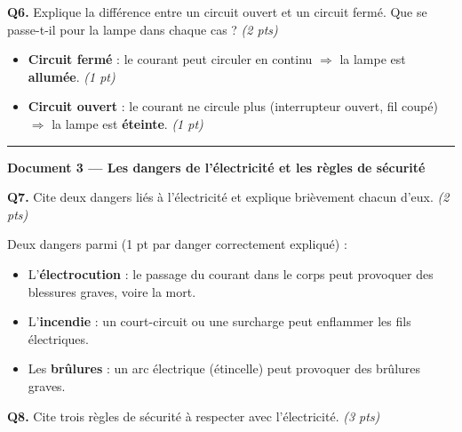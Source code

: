 \documentclass[11pt,a4paper]{article}
\begin{document}
\vspace{3mm}

\textbf{Q6.} Explique la différence entre un circuit ouvert et un circuit fermé. Que se passe-t-il pour la lampe dans chaque cas ? \hfill \textit{(2 pts)}

\begin{tcolorbox}[colback=green!5!white,colframe=green!75!black]
\begin{itemize}
  \item \textbf{Circuit fermé} : le courant peut circuler en continu $\Rightarrow$ la lampe est \textbf{allumée}. \textit{(1 pt)}
  \item \textbf{Circuit ouvert} : le courant ne circule plus (interrupteur ouvert, fil coupé) $\Rightarrow$ la lampe est \textbf{éteinte}. \textit{(1 pt)}
\end{itemize}
\end{tcolorbox}

\vspace{5mm}
\hrule
\vspace{3mm}

\textbf{Document 3 --- Les dangers de l'électricité et les règles de sécurité}

\vspace{3mm}

\textbf{Q7.} Cite deux dangers liés à l'électricité et explique brièvement chacun d'eux. \hfill \textit{(2 pts)}

\begin{tcolorbox}[colback=green!5!white,colframe=green!75!black]
Deux dangers parmi (1 pt par danger correctement expliqué) :
\begin{itemize}
  \item L'\textbf{électrocution} : le passage du courant dans le corps peut provoquer des blessures graves, voire la mort.
  \item L'\textbf{incendie} : un court-circuit ou une surcharge peut enflammer les fils électriques.
  \item Les \textbf{brûlures} : un arc électrique (étincelle) peut provoquer des brûlures graves.
\end{itemize}
\end{tcolorbox}

\vspace{3mm}

\textbf{Q8.} Cite trois règles de sécurité à respecter avec l'électricité. \hfill \textit{(3 pts)}
\end{document}
